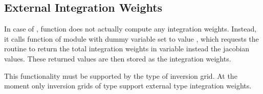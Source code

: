\subsection{External Integration Weights} \label{programs_scripts,sec:fmod_intw,sec:external}
%
In case of , function  does not actually compute
any integration weights. Instead, it calls function  of module 
 with dummy variable  set to value , which 
requests the routine to return the total integration weights in variable  instead the 
jacobian values. These returned values are then stored as the integration weights.

This functionality must be supported by the type of inversion grid. At the moment only inversion grids 
of type  support external type integration weights.

